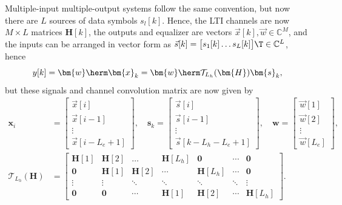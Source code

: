 Multiple-input multiple-output systems follow the same convention, but now there are $L$ sources of data symbols $s_l[k]$. Hence, the LTI channels are now $M\times L$ matrices $\bm{H}[k]$, the outputs and equalizer are vectors $\vec{x}[k],\vec{w}\in\mathbb{C}^M$, and the inputs can be arranged in vector form as $\vec{s}[k]=\big[s_1[k] \ldots s_L[k]\big]\T\in\mathbb{C}^L$, hence  
\begin{equation}
y[k]=\bm{w}\herm \bm{x}_k = \bm{w}\herm \mathcal{T}_{L_h}(\bm{H})\bm{s}_k, \label{eqn:signalmodel_mimo}
\end{equation}
but these signals and channel convolution matrix are now given by
\begin{align}
\bm{x}_i&=\begin{bmatrix}\vec{x}[i]\\ \vec{x}[i-1]\\ \vdots\\ \vec{x}[i-L_e+1]\end{bmatrix},\quad \bm{s}_k = \begin{bmatrix}\vec{s}[i]\\ \vec{s}[i-1]\\ \vdots\\ \vec{s}[k-L_h-L_e+1]\end{bmatrix},\quad \bm{w}=\begin{bmatrix}\vec{w}[1]\\\vec{w}[2]\\ \vdots\\ \vec{w}[L_e]\end{bmatrix},\\
\mathcal{T}_{L_h}(\bm{H})&=\begin{bmatrix}
\bm{H}[1] & \bm{H}[2] & \ldots     & \bm{H}[L_h] & \bm{0}      & \cdots & \bm{0} \\
\bm{0}    & \bm{H}[1] & \bm{H}[2] & \cdots       & \bm{H}[L_h] & \cdots & \bm{0} \\
\vdots     & \vdots     & \ddots     & \ddots       & \ddots       & \ddots & \vdots  \\
\bm{0}    & \bm{0}    & \cdots     & \bm{H}[1]   & \bm{H}[2]   & \cdots & \bm{H}[L_h]
\end{bmatrix}. \label{eqn:signalmodeldesc_mimo}
\end{align}


